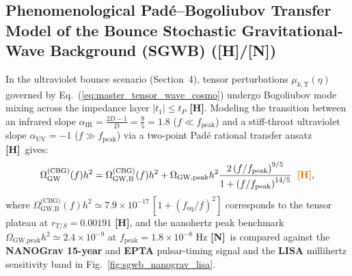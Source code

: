 \documentclass[11pt,a4paper]{article}
\newcommand{\catH}{\textbf{\textcolor{orange!85!black}{[H]}}}
\newcommand{\catN}{\textbf{\textcolor{teal!75!black}{[N]}}}
\theoremstyle{plain}
\theoremstyle{definition}
\theoremstyle{remark}
\numberwithin{equation}{section}
\begin{document}
\subsection{\texorpdfstring{Phenomenological Pad\'e--Bogoliubov Transfer Model of the Bounce Stochastic Gravitational-Wave Background (SGWB) (\catH/\catN)}{Phenomenological Pade-Bogoliubov Transfer Model of the Bounce Stochastic Gravitational-Wave Background (SGWB) ([H]/[N])}}

In the ultraviolet bounce scenario (Section~4), tensor perturbations $\mu_{k,\text{T}}(\eta)$ governed by Eq.~(\ref{eq:master_tensor_wave_cosmo}) undergo Bogoliubov mode mixing across the impedance layer $\lvert t_1 \rvert \le t_P$ \catH. Modeling the transition between an infrared slope $\alpha_{\text{IR}} = \frac{2D - 1}{D} = \frac{9}{5} = 1.8$ ($f \ll f_{\text{peak}}$) and a stiff-throat ultraviolet slope $\alpha_{\text{UV}} = -1$ ($f \gg f_{\text{peak}}$) via a two-point Pad\'e rational transfer ansatz \catH\ gives:
\begin{equation}
\Omega_{\text{GW}}^{\text{(CBG)}}(f) h^2 = \Omega_{\text{GW},\text{B}}^{\text{(CBG)}}(f) h^2 + \Omega_{\text{GW},\text{peak}} h^2 \frac{2\left(f / f_{\text{peak}}\right)^{9/5}}{1 + \left(f / f_{\text{peak}}\right)^{14/5}} \;\;\catH,
\label{eq:sgwb_spectrum_formula}
\end{equation}
where $\Omega_{\text{GW},\text{B}}^{\text{(CBG)}}(f) h^2 \simeq 7.9 \times 10^{-17}\,[1 + (f_{\text{eq}}/f)^2]$ corresponds to the tensor plateau at $r_{T/S} = 0.00191$ \catH, and the nanohertz peak benchmark $\Omega_{\text{GW},\text{peak}} h^2 \simeq 2.4 \times 10^{-9}$ at $f_{\text{peak}} = 1.8 \times 10^{-8}\text{ Hz}$ \catN\ is compared against the \textbf{NANOGrav 15-year} \cite{nanograv2023} and \textbf{EPTA} \cite{epta2023} pulsar-timing signal and the \textbf{LISA} millihertz sensitivity band in Fig.~\ref{fig:sgwb_nanograv_lisa}.
\end{document}
